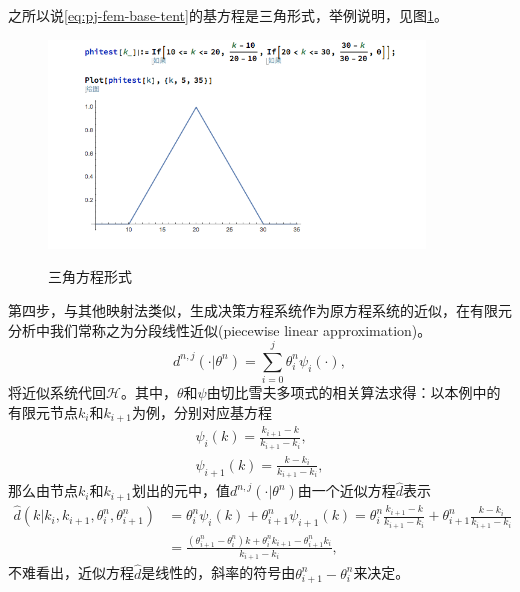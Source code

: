 之所以说\eqref{eq:pj-fem-base-tent}的基方程是三角形式，举例说明，见图\ref{fig:pj-fem-tent}。
\begin{figure}[htbp]
   \caption{三角方程形式}
  \centering
  \includegraphics[width=10cm]{./Figures/20170921-tent-function}
  \label{fig:pj-fem-tent}
%
\end{figure}

第四步，与其他映射法类似，生成决策方程系统作为原方程系统的近似，在有限元分析中我们常称之为分段线性近似(piecewise linear approximation)。
\begin{equation*}
  d^{n,j}\left( \cdot | \theta^n \right) = \sum_{i=0}^{j} \theta^n_i \psi_{i} \left( \cdot \right),
\end{equation*}
将近似系统代回$\mathcal{H}$。其中，$\theta$和$\psi$由切比雪夫多项式的相关算法求得：以本例中的有限元节点$k_i$和$k_{i+1}$为例，分别对应基方程
\begin{equation*}
  \begin{split}
    \psi_{i}(k) = \frac{k_{i+1} - k}{k_{i+1} - k_{i}}, \\
    \psi_{i+1}(k) = \frac{k - k_{i}}{k_{i+1} - k_i},
  \end{split}
\end{equation*}
那么由节点$k_i$和$k_{i+1}$划出的元中，值$d^{n,j}\left( \cdot | \theta^n \right)$由一个近似方程$\hat{d}$表示
\begin{equation*}
\begin{split}
    \hat{d} \left( k | k_{i}, k_{i+1}, \theta^n_i, \theta^n_{i+1} \right) &= \theta_i^n \psi_i(k) + \theta_{i+1}^n \psi_{i+1}(k) =\theta_i^n \frac{k_{i+1} - k}{k_{i+1} - k_{i}} + \theta_{i+1}^n \frac{k - k_{i}}{k_{i+1} - k_i} \\
    &= \frac{
    \left( \theta_{i+1}^n - \theta_{i}^n \right) k + \theta_{i}^n k_{i+1} - \theta_{i+1}^n k_{i}
    }{k_{i+1} - k_i},
\end{split}
\end{equation*}
不难看出，近似方程$\hat{d}$是线性的，斜率的符号由$\theta_{i+1}^n - \theta_{i}^n$来决定。


